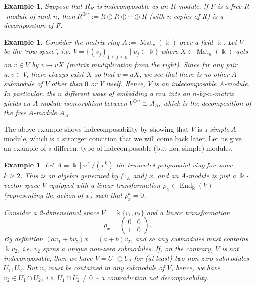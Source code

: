 \documentclass[11pt,a4paper]{article}
\numberwithin{equation}{section}
\theoremstyle{all}
\newtheorem{example}[theorem]{Example}
\theoremstyle{remark}
\newcommand{\End}{\operatorname{End}\nolimits}
\newcommand{\Mat}{\operatorname{Mat}\nolimits}
\newcommand{\defn}[1]{\textsl{\color{darkblue} #1}}
\begin{document}
\begin{example}
Suppose that $R_R$ is indecomposable as an $R$-module.
If $F$ is a free $R$-module of rank $n$, then $R^{\oplus n}:=R\oplus R\oplus \cdots \oplus R$ (with $n$ copies of $R$) is a decomposition of $F$.
\end{example}

\begin{example}
Consider the matrix ring $A:=\Mat_n(\Bbbk)$ over a field $\Bbbk$.  Let $V$ be the `row space', i.e. $V=\{(v_j)_{1\leq j\leq n}\mid v_j\in \Bbbk\}$ where $X\in \Mat_n(\Bbbk)$ acts on $v\in V$ by $v\mapsto vX$ (matrix multiplication from the right).  
Since for any pair $u,v\in V$, there always exist $X$ so that $v=uX$, we see that there is no other $A$-submodule of $V$ other than $0$ or $V$ itself.
Hence, $V$ is an indecomposable $A$-module.
In particular, the $n$ different ways of embedding a row into an $n$-by-$n$-matrix yields an $A$-module isomorphism between $V^{\oplus n}\cong A_A$, which is the decomposition of the free $A$-module $A_A$.
\end{example}

The above example shows indecomposability by showing that $V$ is a \emph{simple} $A$-module, which is a stronger condition that we will come back later.
Let us give an example of a different type of indecomposable (but non-simple) modules.

\begin{example}
Let $A=\Bbbk[x]/(x^k)$ the \defn{truncated polynomial ring} for some $k\geq 2$.
This is an algebra generated by ($1_A$ and) $x$, and an $A$-module is just a $\Bbbk$-vector space $V$ equipped with a linear transformation $\rho_x\in \End_{\Bbbk}(V)$ (representing the action of $x$) such that $\rho_x^k=0$.

Consider a 2-dimensional space $V=\Bbbk \{v_1,v_2\}$ and a linear transformation
\[\rho_x = \begin{pmatrix}0 & 0 \\ 1 & 0\end{pmatrix}.\]
By definition $(av_1+bv_2)x = (a+b)v_2$, and so any submodules must contains $\Bbbk v_2$, i.e. $v_2$ spans a unique non-zero submodules.   
If, on the contrary, $V$ is not indecomposable, then we have $V=U_1\oplus U_2$ for (at least) two non-zero submodules $U_1,U_2$.  But $v_2$ must be contained in any submodule of $V$, hence, we have $v_2 \in U_1\cap U_2$, i.e. $U_1\cap U_2\neq 0$ -- a contradiction not decomposability.
\end{example}
\end{document}
